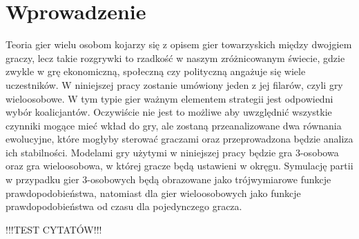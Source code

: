 \chapter{Wprowadzenie}
\label{cha:wprowadzenie}

Teoria gier wielu osobom kojarzy się z opisem gier towarzyskich między dwojgiem graczy, lecz takie rozgrywki to rzadkość w naszym zróżnicowanym świecie, gdzie zwykle w grę ekonomiczną, społeczną czy polityczną angażuje się wiele uczestników. 
W niniejszej pracy zostanie umówiony jeden z jej filarów, czyli gry wieloosobowe. W tym typie gier ważnym elementem strategii jest odpowiedni wybór koalicjantów. Oczywiście nie jest to możliwe aby uwzględnić wszystkie czynniki mogące mieć wkład do gry, ale zostaną przeanalizowane dwa równania ewolucyjne, które mogłyby sterować graczami oraz przeprowadzona będzie analiza ich stabilności. Modelami gry użytymi w niniejszej pracy będzie gra 3-osobowa oraz gra wieloosobowa, w której gracze będą ustawieni w okręgu. Symulację partii w przypadku gier 3-osobowych będą obrazowane jako trójwymiarowe funkcje prawdopodobieństwa, natomiast dla gier wieloosobowych jako funkcje prawdopodobieństwa od czasu dla pojedynczego gracza.


!!!TEST CYTATÓW!!! \cite{Now06} \cite{Hof98} \cite{Str01} \cite{Qt} \cite{Tut} \cite{Sza} \cite{Fsmd}